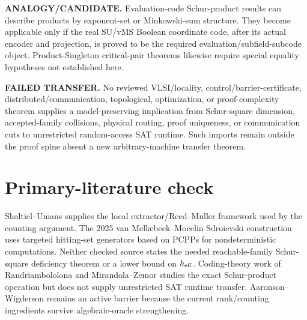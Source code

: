 \documentclass[11pt]{article}
\begin{document}
\textbf{ANALOGY/CANDIDATE.}
Evaluation-code Schur-product results can describe products by exponent-set or Minkowski-sum structure. They become applicable only if the real SU/vMS Boolean coordinate code, after its actual encoder and projection, is proved to be the required evaluation/subfield-subcode object. Product-Singleton critical-pair theorems likewise require special equality hypotheses not established here.

\textbf{FAILED TRANSFER.}
No reviewed VLSI/locality, control/barrier-certificate, distributed/communication, topological, optimization, or proof-complexity theorem supplies a model-preserving implication from Schur-square dimension, accepted-family collisions, physical routing, proof uniqueness, or communication cuts to unrestricted random-access SAT runtime. Such imports remain outside the proof spine absent a new arbitrary-machine transfer theorem.

\section*{Primary-literature check}
Shaltiel--Umans supplies the local extractor/Reed--Muller framework used by the counting argument. The 2025 van Melkebeek--Mocelin Sdroievski construction uses targeted hitting-set generators based on PCPPs for nondeterministic computations. Neither checked source states the needed reachable-family Schur-square deficiency theorem or a lower bound on \(h_{\rm eff}\). Coding-theory work of Randriambololona and Mirandola--Zemor studies the exact Schur-product operation but does not supply unrestricted SAT runtime transfer. Aaronson--Wigderson remains an active barrier because the current rank/counting ingredients survive algebraic-oracle strengthening.
\end{document}
